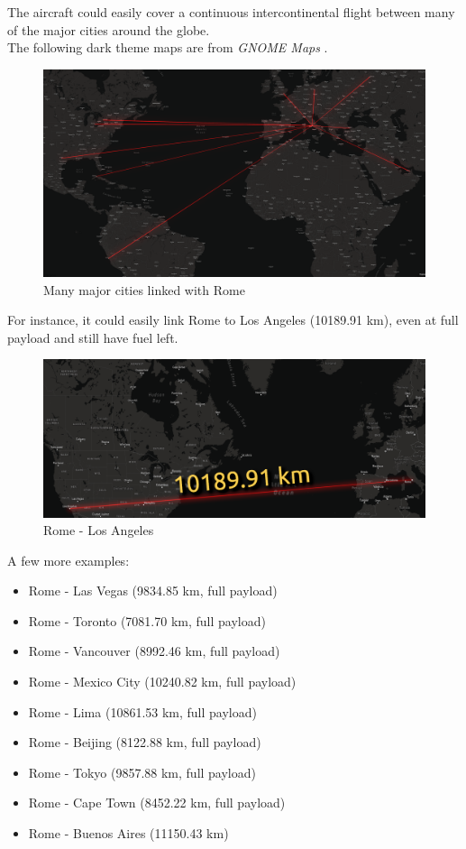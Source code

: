 \documentclass{article}
\begin{document}
The aircraft could easily cover a continuous intercontinental flight between many of the major cities around the globe.\\ 
The following dark theme maps are from \textit{GNOME Maps} \autocite{Gnome_maps}. 

\begin{figure}[h!]
    \centering
    \includegraphics[width=\textwidth]{Sources/Plots_and_Pictures/worldwide_routes.png}
    \caption{Many major cities linked with Rome}
    \label{worldwide_maps}
\end{figure}
For instance, it could easily link Rome to Los Angeles (10189.91 km), even at full payload
and still have fuel left.
\begin{figure}[h!]
    \centering
    \includegraphics[width=\textwidth]{Sources/Plots_and_Pictures/rome_LA.png}
    \caption{Rome - Los Angeles}
    \label{rome_LA}
\end{figure}

\clearpage

A few more examples: 

\begin{itemize}
    \item Rome - Las Vegas (9834.85 km, full payload)
    \item Rome - Toronto (7081.70 km, full payload)
    \item Rome - Vancouver (8992.46 km, full payload)
    \item Rome - Mexico City (10240.82 km, full payload)
    \item Rome - Lima (10861.53 km, full payload)
    \item Rome - Beijing (8122.88 km, full payload)
    \item Rome - Tokyo (9857.88 km, full payload)
    \item Rome - Cape Town (8452.22 km, full payload)
    \item Rome - Buenos Aires (11150.43 km)
\end{itemize}
\end{document}
